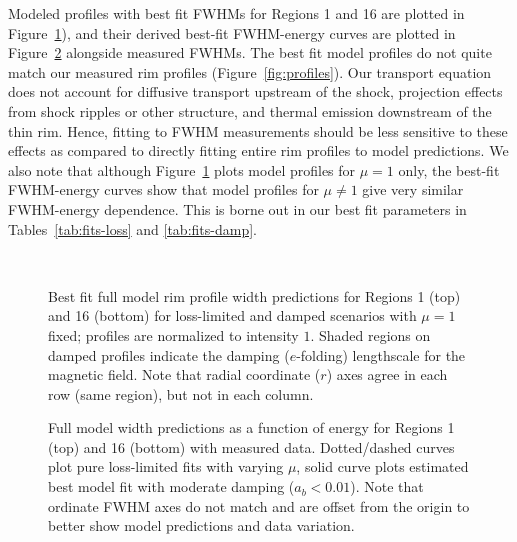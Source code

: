 \documentclass[iop, apj, numberedappendix]{emulateapj}
\begin{document}
Modeled profiles with best fit FWHMs for Regions 1 and 16 are plotted in
Figure~\ref{fig:rims}), and their derived best-fit FWHM-energy curves
are plotted in Figure~\ref{fig:fits} alongside measured FWHMs.
The best fit model profiles do not quite match our measured rim profiles
(Figure~\ref{fig:profiles}).  Our transport equation does not account for
diffusive transport upstream of the shock, projection effects from shock
ripples or other structure, and thermal emission downstream of the thin rim.
Hence, fitting to FWHM measurements should be less sensitive to these effects
as compared to directly fitting entire rim profiles to model predictions.
We also note that although Figure~\ref{fig:rims} plots model profiles for
$\mu = 1$ only, the best-fit FWHM-energy curves show that model profiles for
$\mu \neq 1$ give very similar FWHM-energy dependence.  This is borne out in
our best fit parameters in Tables~\ref{tab:fits-loss} and \ref{tab:fits-damp}.

\begin{figure}
    \centering
    \iftoggle{manuscript}{
        \epsscale{0.5}
    }{}
     \\
    \caption{Best fit full model rim profile width predictions for Regions 1
        (top) and 16 (bottom) for loss-limited and damped scenarios with
        $\mu = 1$ fixed; profiles are normalized to intensity $1$.  Shaded
        regions on damped profiles indicate the damping ($e$-folding)
        lengthscale for the magnetic field.  Note that radial coordinate ($r$)
        axes agree in each row (same region), but not in each column.
    \label{fig:rims}}
\end{figure}

\begin{figure}
    \centering
    \iftoggle{manuscript}{
        \texttt{[image: figures/full-man\_err-energywidth-01.pdf]}
        \texttt{[image: figures/full-man\_err-energywidth-16.pdf]}
    }{
        \texttt{[image: figures/full-man\_err-energywidth-01.pdf]}
        \texttt{[image: figures/full-man\_err-energywidth-16.pdf]}
    }
    \caption{Full model width predictions as a function of energy for Regions 1
    (top) and 16 (bottom) with measured data.  Dotted/dashed curves plot
    pure loss-limited fits with varying $\mu$, solid curve plots estimated best
    model fit with moderate damping ($a_b < 0.01$).  Note that ordinate FWHM
    axes do not match and are offset from the origin to better show model
    predictions and data variation.
    \label{fig:fits}}
\end{figure}
\end{document}

